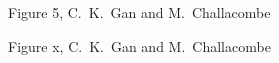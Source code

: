 \commentoutA{\documentclass[prl,aps,twocolumn,showpacs,twocolumngrid,superbib]{revtex4}}
\begin{document}
{\pagebreak
\begin{center}
Figure 5, C.~K.~Gan and M.~Challacombe \\[1.cm]
\end{center}

\pagebreak
\begin{center}
Figure x, C.~K.~Gan and M.~Challacombe \\[1.cm]
\end{center}
}

\appendix
\end{document}
